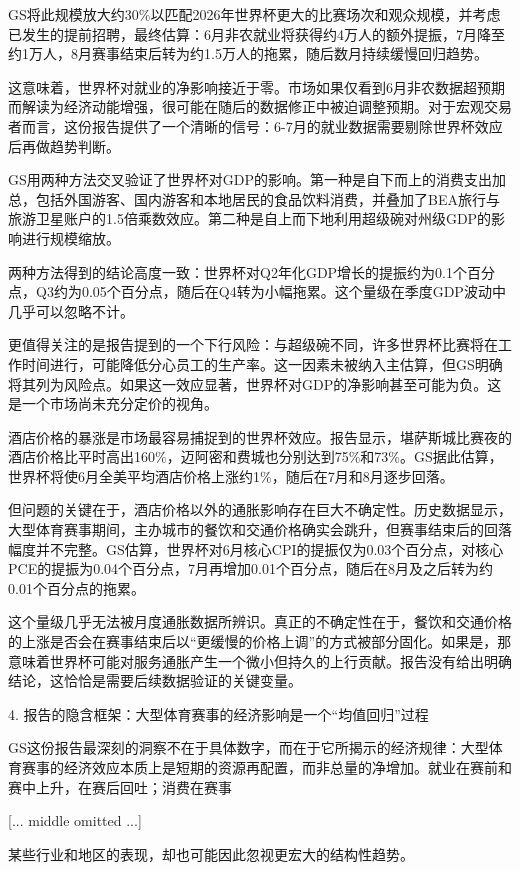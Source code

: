 \documentclass[11pt]{ctexart}
\begin{document}
GS将此规模放大约30\%以匹配2026年世界杯更大的比赛场次和观众规模，并考虑已发生的提前招聘，最终估算：6月非农就业将获得约4万人的额外提振，7月降至约1万人，8月赛事结束后转为约1.5万人的拖累，随后数月持续缓慢回归趋势。

这意味着，世界杯对就业的净影响接近于零。市场如果仅看到6月非农数据超预期而解读为经济动能增强，很可能在随后的数据修正中被迫调整预期。对于宏观交易者而言，这份报告提供了一个清晰的信号：6-7月的就业数据需要剔除世界杯效应后再做趋势判断。

GS用两种方法交叉验证了世界杯对GDP的影响。第一种是自下而上的消费支出加总，包括外国游客、国内游客和本地居民的食品饮料消费，并叠加了BEA旅行与旅游卫星账户的1.5倍乘数效应。第二种是自上而下地利用超级碗对州级GDP的影响进行规模缩放。

两种方法得到的结论高度一致：世界杯对Q2年化GDP增长的提振约为0.1个百分点，Q3约为0.05个百分点，随后在Q4转为小幅拖累。这个量级在季度GDP波动中几乎可以忽略不计。

更值得关注的是报告提到的一个下行风险：与超级碗不同，许多世界杯比赛将在工作时间进行，可能降低分心员工的生产率。这一因素未被纳入主估算，但GS明确将其列为风险点。如果这一效应显著，世界杯对GDP的净影响甚至可能为负。这是一个市场尚未充分定价的视角。

酒店价格的暴涨是市场最容易捕捉到的世界杯效应。报告显示，堪萨斯城比赛夜的酒店价格比平时高出160\%，迈阿密和费城也分别达到75\%和73\%。GS据此估算，世界杯将使6月全美平均酒店价格上涨约1\%，随后在7月和8月逐步回落。

但问题的关键在于，酒店价格以外的通胀影响存在巨大不确定性。历史数据显示，大型体育赛事期间，主办城市的餐饮和交通价格确实会跳升，但赛事结束后的回落幅度并不完整。GS估算，世界杯对6月核心CPI的提振仅为0.03个百分点，对核心PCE的提振为0.04个百分点，7月再增加0.01个百分点，随后在8月及之后转为约0.01个百分点的拖累。

这个量级几乎无法被月度通胀数据所辨识。真正的不确定性在于，餐饮和交通价格的上涨是否会在赛事结束后以“更缓慢的价格上调”的方式被部分固化。如果是，那意味着世界杯可能对服务通胀产生一个微小但持久的上行贡献。报告没有给出明确结论，这恰恰是需要后续数据验证的关键变量。

4. 报告的隐含框架：大型体育赛事的经济影响是一个“均值回归”过程

GS这份报告最深刻的洞察不在于具体数字，而在于它所揭示的经济规律：大型体育赛事的经济效应本质上是短期的资源再配置，而非总量的净增加。就业在赛前和赛中上升，在赛后回吐；消费在赛事

[... middle omitted ...]

某些行业和地区的表现，却也可能因此忽视更宏大的结构性趋势。
\end{document}
